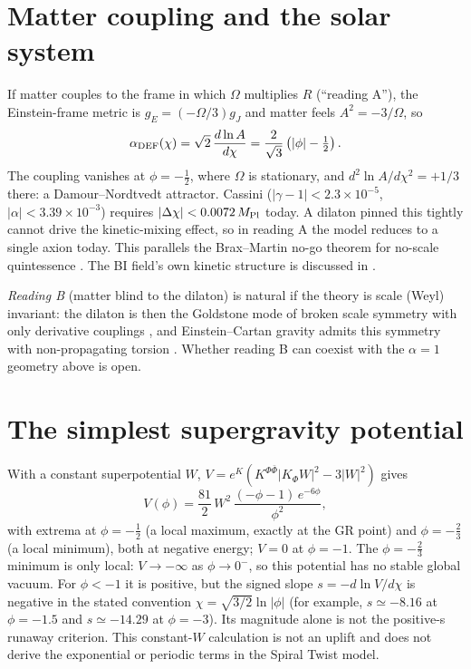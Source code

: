 \documentclass[11pt]{article}
\newcommand{\Mp}{M_{\rm Pl}}
\begin{document}
\section{Matter coupling and the solar system}
If matter couples to the frame in which $\Omega$ multiplies $R$ (``reading A''), the Einstein-frame metric is
$g_E=(-\Omega/3)g_J$ and matter feels $A^2=-3/\Omega$, so
\begin{equation}
\alpha_{\rm DEF}(\chi)=\sqrt2\,\frac{d\ln A}{d\chi}=\frac{2}{\sqrt3}\left(|\phi|-\tfrac12\right).
\end{equation}
The coupling vanishes at $\phi=-\tfrac12$, where $\Omega$ is stationary, and $d^2\ln A/d\chi^2=+1/3$ there: a
Damour--Nordtvedt attractor. Cassini ($|\gamma-1|<2.3\times10^{-5}$, $|\alpha|<3.39\times10^{-3}$) requires
$|\Delta\chi|<0.0072\,\Mp$ today. A dilaton pinned this tightly cannot drive the kinetic-mixing effect, so in
reading A the model reduces to a single axion today. This parallels the Brax--Martin no-go theorem for no-scale quintessence
\cite{brax2007}. The BI field's own kinetic structure is discussed in \cite{taveras2008,calcagni2009}.

\emph{Reading B} (matter blind to the dilaton) is natural if the theory is scale (Weyl) invariant: the dilaton is
then the Goldstone mode of broken scale symmetry with only derivative couplings \cite{blas2011,ferreira2017}, and
Einstein--Cartan gravity admits this symmetry with non-propagating torsion \cite{karananas2021,piani2022}. Whether
reading B can coexist with the $\alpha=1$ geometry above is open.

\section{The simplest supergravity potential}
With a constant superpotential $W$, $V=e^K(K^{\Phi\bar\Phi}|K_\Phi W|^2-3|W|^2)$ gives
\begin{equation}
V(\phi)=\frac{81}{2}\,W^2\,\frac{(-\phi-1)\,e^{-6\phi}}{\phi^2},
\end{equation}
with extrema at $\phi=-\tfrac12$ (a local maximum, exactly at the GR point) and $\phi=-\tfrac23$ (a local minimum),
both at negative energy; $V=0$ at $\phi=-1$. The $\phi=-\tfrac23$ minimum is only local: $V\to-\infty$ as
$\phi\to0^{-}$, so this potential has no stable global vacuum. For $\phi<-1$ it is positive, but the signed slope
$s=-d\ln V/d\chi$ is negative in the stated convention $\chi=\sqrt{3/2}\ln|\phi|$ (for example, $s\simeq-8.16$
at $\phi=-1.5$ and $s\simeq-14.29$ at $\phi=-3$). Its magnitude alone is not the positive-s runaway criterion.
This constant-$W$ calculation is not an uplift and does not derive the exponential or periodic terms in the Spiral
Twist model.
\end{document}
